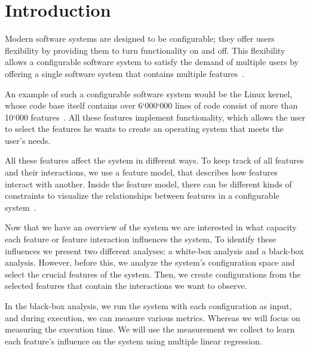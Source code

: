 \chapter{Introduction}\label{ch:introduction}

Modern software systems are designed to be configurable; they offer users flexibility by providing them to turn functionality on and off.
This flexibility allows a configurable software system to satisfy the demand of multiple users by offering a single software system that 
contains multiple features~\cite{Feature-Oriented-Software-Product-Lines}. 

An example of such a configurable software system would be the Linux kernel, whose code base itself contains over 6`000`000 lines of code consist of more 
than 10`000 features~\cite{Linux-Kernel}. 
All these features implement functionality, which allows the user to select the features he wants to create an operating system that meets the user's needs. 

All these features affect the system in different ways. To keep track of all features and their interactions, we use a feature model, 
that describes how features interact with another.
Inside the feature model, there can be different kinds of constraints to visualize the relationships 
between features in a configurable system~\cite{Feature-Oriented-Software-Product-Lines}. 

Now that we have an overview of the system we are interested in what capacity each feature or feature interaction influences the system,
To identify these influences we present two different analyses: a white-box analysis and a black-box analysis.
However, before this, we analyze the system's configuration space and select the crucial features of the system.
Then, we create configurations from the selected features that contain the interactions we want to observe.

In the black-box analysis, we run the system with each configuration as input, and during execution, we can measure various metrics.
Whereas we will focus on measuring the execution time. We will use the measurement we collect to learn each feature's influence on the system 
using multiple linear regression.


